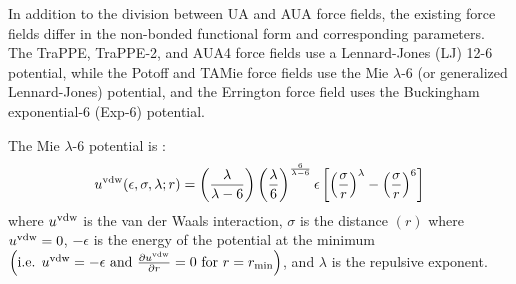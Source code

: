 \documentclass[preprint,letterpaper,floatfix,citeautoscript,aip,jcp]{revtex4-1}
\begin{document}
%
%

%

In addition to the 
division between
UA and AUA force fields, the existing force fields differ in the non-bonded functional form and corresponding parameters. The TraPPE, TraPPE-2, and AUA4 force fields use a Lennard-Jones (LJ) 12-6 potential, while the Potoff and TAMie force fields use the Mie $\lambda$-6 (or generalized Lennard-Jones) potential, and the Errington force field uses the Buckingham exponential-6 (Exp-6) potential. 

The Mie $\lambda$-6 potential is \cite{Herdes2015}:
\begin{equation} \label{eq:Mie}
u^{\rm vdw}(\epsilon,\sigma,\lambda;r) = \left(\frac{\lambda}{\lambda - 6}\right)\left(\frac{\lambda}{6}\right)^{\frac{6}{\lambda - 6}} \epsilon \left[\left(\frac{\sigma}{r}\right)^\lambda - \left(\frac{\sigma}{r}\right)^6\right]
\end{equation} 
where $u^{\rm vdw}$ is the van der Waals interaction, $\sigma$ is the distance $(r)$ where $u^{\rm vdw} = 0$, $-\epsilon$ is the energy of the potential at the minimum $\left(\text{i.e. }u^{\rm vdw} = -\epsilon \text{ and } \frac{\partial u^{\rm vdw}}{\partial r} = 0 \text{ for } r=r_{\rm min} \right)$, and $\lambda$ is the repulsive exponent. 
\end{document}
